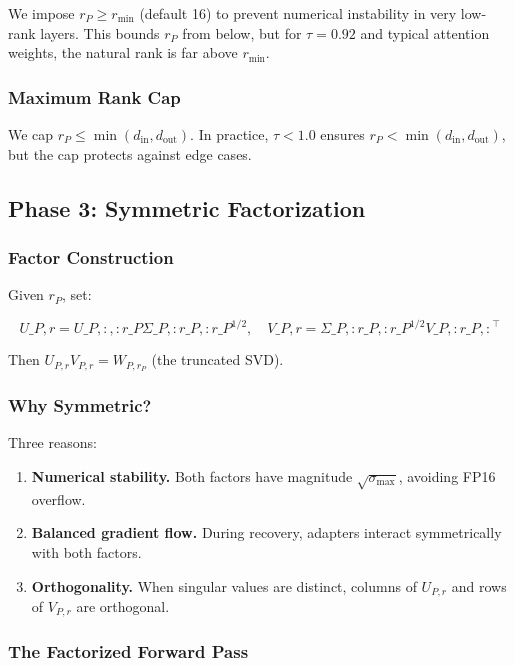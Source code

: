 We impose $r_P \geq r_\text{min}$ (default 16) to prevent numerical 
instability in very low-rank layers. This bounds $r_P$ from below, but for 
$\tau = 0.92$ and typical attention weights, the natural rank is far above 
$r_\text{min}$.

\subsubsection{Maximum Rank Cap}

We cap $r_P \leq \min(d_\text{in}, d_\text{out})$. In practice, $\tau < 1.0$ 
ensures $r_P < \min(d_\text{in}, d_\text{out})$, but the cap protects against 
edge cases.

\subsection{Phase 3: Symmetric Factorization}

\subsubsection{Factor Construction}

Given $r_P$, set:

\[
U\_{P, r} = U\_{P, :, :r\_P} \Sigma\_{P, :r\_P, :r\_P}^{1/2}, \quad
V\_{P, r} = \Sigma\_{P, :r\_P, :r\_P}^{1/2} V\_{P, :r\_P, :}^\top
\tag{4.4}
\]

Then $U_{P, r} V_{P, r} = W_{P, r_P}$ (the truncated SVD).

\subsubsection{Why Symmetric?}

Three reasons:

\begin{enumerate}
\item \textbf{Numerical stability.} Both factors have magnitude $\sqrt{\sigma_\text{max}}$,
  avoiding FP16 overflow.

\item \textbf{Balanced gradient flow.} During recovery, adapters interact symmetrically
  with both factors.

\item \textbf{Orthogonality.} When singular values are distinct, columns of $U_{P, r}$
  and rows of $V_{P, r}$ are orthogonal.

\end{enumerate}
\subsubsection{The Factorized Forward Pass}

